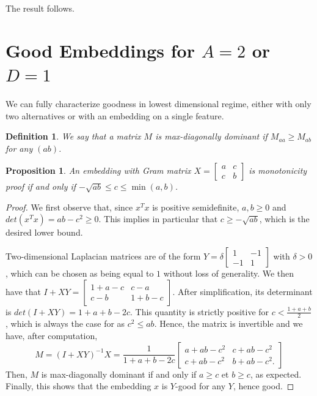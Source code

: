 \documentclass{article}
\newtheorem{definition}{Definition}
\newtheorem{proposition}{Proposition}
\begin{document}
    The result follows.


\section{Good Embeddings for $A = 2$ or $D=1$}
\label{app:A2D1}

 We can fully characterize goodness in lowest dimensional regime, either with only two alternatives or with an embedding on a single feature.

\begin{definition}
    We say that a matrix $M$ is max-diagonally dominant if $M_{aa} \geq M_{ab}$ for any $(ab)$.
\end{definition}

\begin{proposition}
\label{prop:strictmonotA=2}
    An embedding with Gram matrix 
    $X = \begin{bmatrix}
        a & c \\
        c & b
    \end{bmatrix}$ 
    is monotonicity proof if and only if 
    $- \sqrt{ab} \leq c \leq \min(a,b)$.
\end{proposition}

\begin{proof}
We first observe that, since $x^T x$ is positive semidefinite,  $a,b \geq 0$ and $det(x^T x) = ab - c^2 \geq 0$. This implies in particular that $c \geq - \sqrt{ab}$, which is the desired lower bound.

Two-dimensional Laplacian matrices are of the form 
$Y = \delta \left[\begin{matrix}
    1 & -1 \\
    -1 & 1 
\end{matrix}\right]$ 
with $\delta > 0$, which can be chosen as being equal to $1$ without loss of generality. We then have that $I + X Y = \left[\begin{matrix}
    1 + a - c & c - a \\
    c - b & 1 + b - c 
\end{matrix}\right]$. After simplification, its determinant is $det(I + XY) = 1 + a + b - 2c$. This quantity is strictly positive for $ c < \frac{1 + a + b}{2}$, which is always the case for as $c^2 \leq ab$. Hence, the matrix is invertible and we have, after computation,
\begin{equation}
    M = (I +XY)^{-1} X = \frac{1}{1 + a + b - 2c} \left[\begin{matrix}
    a + ab - c^2  & c + ab  - c^2  \\
    c + ab - c^2 & b + ab - c^2.
\end{matrix}\right]
\end{equation}
Then, $M$ is max-diagonally dominant if and only if $a \geq c$ et $b \geq c$, as expected. Finally, this shows that the embedding $x$ is $Y$-good for any $Y$, hence good.
\end{proof}
\end{document}
